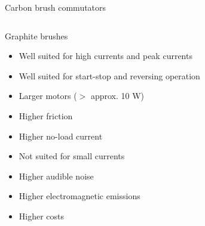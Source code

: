 \documentclass[compress]{beamer}
\begin{document}
\begin{frame}{Carbon brush commutators}
    \begin{columns}
        \begin{column}{0.6\linewidth}

            Graphite brushes

            \begin{itemize}
                \item Well suited for high currents and peak currents
                \item Well suited for start-stop and reversing operation
                \item Larger motors ($>$ approx. 10 W)
                \item Higher friction
                \item Higher no-load current
                \item Not suited for small currents
                \item Higher audible noise
                \item Higher electromagnetic emissions
                \item Higher costs
            \end{itemize}

        \end{column}
        \begin{column}{0.4\linewidth}

            \begin{center}


\end{center}
\end{column}
\end{columns}
\end{frame}
\end{document}
